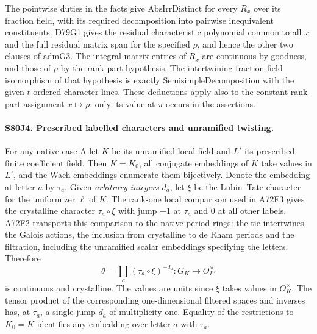 The pointwise $\mathrm{duties}$ in the facts give
$\mathrm{AbsIrrDistinct}$ for every $R_x$ over its fraction field,
with its required decomposition into pairwise inequivalent constituents.
D79G1 gives the residual characteristic polynomial common to all $x$
and the full residual matrix span for the specified $\rho$, and hence
the other two clauses of $\mathrm{admG3}$. The integral matrix entries
of $R_x$ are continuous by goodness, and those of $\rho$ by the
rank-part hypothesis. The intertwining fraction-field isomorphism
of that hypothesis is exactly $\mathrm{SemisimpleDecomposition}$
with the given $t$ ordered character lines. These deductions apply
also to the constant rank-part assignment $x\mapsto\rho$: only its
value at $\pi$ occurs in the assertions.

\paragraph{S80J4. Prescribed labelled characters and unramified twisting.}
For any native case A let $K$ be its unramified local field and $L'$
its prescribed finite coefficient field. Then $K=K_0$, all conjugate
embeddings of $K$ take values in $L'$, and the Wach embeddings
enumerate them bijectively. Denote the embedding at letter $a$ by
$\tau_a$. Given \emph{arbitrary integers} $d_a$, let $\xi$ be the
Lubin--Tate character for the uniformizer $\ell$ of $K$. The
rank-one local comparison used in A72F3 gives the crystalline
character $\tau_a\circ\xi$ with jump $-1$ at $\tau_a$ and $0$ at
all other labels. A72F2 transports this comparison to the native
period rings: the tie intertwines the Galois actions, the inclusion
from crystalline to de Rham periods and the filtration, including the
unramified scalar embeddings specifying the letters. Therefore
\[
                     \theta=\prod_a(\tau_a\circ\xi)^{-d_a}
                        :G_K\longrightarrow O_{L'}^\times
\]
is continuous and crystalline. The values are units since $\xi$
takes values in $O_K^\times$. The tensor product of the corresponding
one-dimensional filtered spaces and inverses has, at $\tau_a$, a
single jump $d_a$ of multiplicity one. Equality of the restrictions
to $K_0=K$ identifies any embedding over letter $a$ with $\tau_a$.

